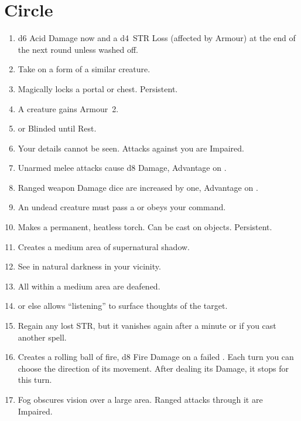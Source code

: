 \documentclass[itdr]{subfiles}
\begin{document}

\vfill
\break

\section{ Circle}
\def \spellcircle {2}
\begin{enumerate}
	\item {} d6 Acid Damage now and a d4~STR Loss (affected by Armour) at the end of the next round unless washed off.
	\item {} Take on a form of a similar creature.
	\item {} Magically locks a portal or chest. Persistent.
	\item {} A creature gains Armour~2.
	\item {}  or Blinded until Rest.
	\item {} Your details cannot be seen. Attacks against you are Impaired.
	\item {} Unarmed melee attacks cause d8 Damage, Advantage on .
	\item {} Ranged weapon Damage dice are increased by one, Advantage on .
	\item {} An undead creature must pass a  or obeys your command.
	\item {} Makes a permanent, heatless torch. Can be cast on objects. Persistent.
	\item {} Creates a medium area of supernatural shadow.
	\item {} See in natural darkness in your vicinity.
	\item {} All within a medium area are deafened.
	\item {}  or else allows \mbox{``listening''} to surface thoughts of the target.
	\item {} Regain any lost STR, but it vanishes again after a minute or if you cast another spell.
	\item {} Creates a rolling ball of fire, d8 Fire Damage on a failed . Each turn you can choose the direction of its movement. After dealing its Damage, it stops for this turn.
	\item {} Fog obscures vision over a large area. Ranged attacks through it are Impaired.

\end{enumerate}
\end{document}
